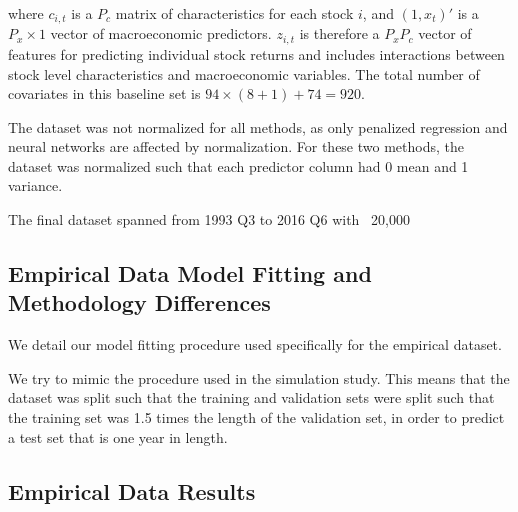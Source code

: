 \documentclass[a4paper, table]{article}
\begin{document}
where $c_{i,t}$ is a $P_c$ matrix of characteristics for each stock $i$, and $(1, x_t)'$ is a $P_x \times 1$ vector of macroeconomic predictors. $z_{i,t}$ is therefore a $P_x P_c$ vector of features for predicting individual stock returns and includes interactions between stock level characteristics and macroeconomic variables. The total number of covariates in this baseline set is $94 \times (8 + 1) + 74 = 920$.

The dataset was not normalized for all methods, as only penalized regression and neural networks are affected by normalization. For these two methods, the dataset was normalized such that each predictor column had 0 mean and 1 variance.

The final dataset spanned from 1993 Q3 to 2016 Q6 with ~20,000

\subsection{Empirical Data Model Fitting and Methodology Differences}

We detail our model fitting procedure used specifically for the empirical dataset.

We try to mimic the procedure used in the simulation study. This means that the dataset was split such that the training and validation sets were split such that the training set was 1.5 times the length of the validation set, in order to predict a test set that is one year in length.

\subsection{Empirical Data Results}


\end{document}
